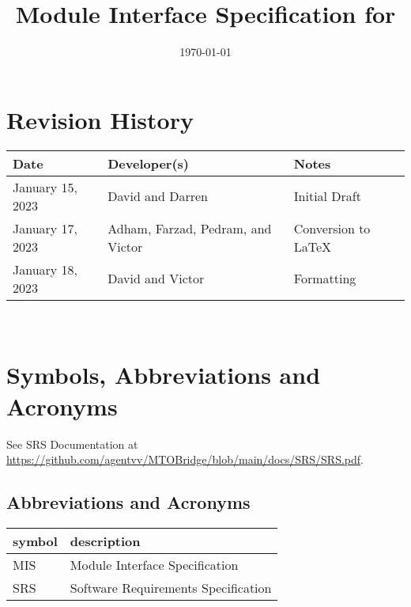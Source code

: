 \documentclass[12pt, titlepage]{article}
\begin{document}
\title{Module Interface Specification for \progname{}}

\author{\authname}

\date{\today}

\maketitle


\section{Revision History}

\begin{tabularx}{\textwidth}{p{3cm}p{7cm}X}
\toprule {\bf Date} & {\bf  Developer(s)} & {\bf Notes}\\
\midrule
January 15, 2023 & David and Darren & Initial Draft\\
January 17, 2023 & Adham, Farzad, Pedram, and Victor & Conversion to LaTeX\\
January 18, 2023 & David and Victor & Formatting\\
\bottomrule
\end{tabularx}

~\newpage

\section{Symbols, Abbreviations and Acronyms}

See SRS Documentation at \url{https://github.com/agentvv/MTOBridge/blob/main/docs/SRS/SRS.pdf}.

\subsection{Abbreviations and Acronyms}
\renewcommand{\arraystretch}{1.2}
\begin{tabular}{l l} 
  \toprule		
  \textbf{symbol} & \textbf{description}\\
  \midrule
  MIS & Module Interface Specification \\
  SRS & Software Requirements Specification\\
  \bottomrule
\end{tabular}\\

\newpage

\tableofcontents

\newpage
\end{document}
